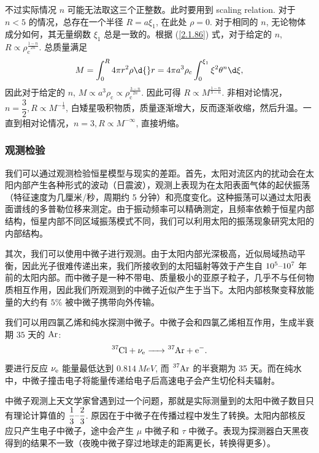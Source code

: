\documentclass[../天体物理基础.tex]{subfiles}
\begin{document}
不过实际情况 $n$ 可能无法取这三个正整数。此时要用到 scaling relation. 对于 $n<5$ 的情况，总存在一个半径 $R=a\xi_{1}$, 在此处 $\rho=0$. 对于相同的 $n$, 无论物体成分如何，其无量纲数 $\xi_{1}$ 总是一致的。根据 (\ref{2.1.86}) 式，对于给定的 $n$, $R\propto\rho_{\mathrm{c}}^{\frac{1-n}{2n}}$. 总质量满足
\begin{equation}
M=\int_{0}^{R}4\pi{}r^{2}\rho\d{}r=4\pi{}a^{3}\rho_{\mathrm{c}}\int_{0}^{\xi_{1}}\xi^{2}\theta^{n}\d\xi,
\end{equation}
因此对于给定的 $n$, $M\propto{}a^{3}\rho_{\mathrm{c}}\propto\rho_{\mathrm{c}}^{\frac{3-n}{2n}}$. 因此可得 $R\propto{}M^{\frac{1-n}{3-n}}$. 非相对论情况，$n=\dfrac{3}{2}, R\propto{}M^{-\frac{1}{3}}$, 白矮星吸积物质，质量逐渐增大，反而逐渐收缩，然后升温。一直到相对论情况，$n=3, R\propto{}M^{-\infty}$, 直接坍缩。

\subsubsection{观测检验}
我们可以通过观测检验恒星模型与现实的差距。首先，太阳对流区内的扰动会在太阳内部产生各种形式的波动（日震波），观测上表现为在太阳表面气体的起伏振荡（特征速度为几厘米/秒，周期约 5 分钟）和亮度变化。这种振荡可以通过太阳表面谱线的多普勒位移来测定。由于振动频率可以精确测定，且频率依赖于恒星内部结构，恒星内部不同区域振荡模式不同，我们可以利用太阳的振荡现象研究太阳的内部结构。

其次，我们可以使用中微子进行观测。由于太阳内部光深极高，近似局域热动平衡，因此光子很难传递出来，我们所接收到的太阳辐射等效于产生自 $10^{5}\text{\textendash}10^{7}$ 年前的太阳内部。而中微子是一种不带电、质量极小的亚原子粒子，几乎不与任何物质相互作用，因此我们所观测到的中微子近似产生于当下。太阳内部核聚变释放能量的大约有 $5\%$ 被中微子携带向外传输。

我们可以用四氯乙烯和纯水探测中微子。中微子会和四氯乙烯相互作用，生成半衰期 $35$ 天的 $\ce{Ar}$:
\begin{equation}
\ce{^{37}Cl}+\nu_{\ce{e}}\ce{->^{37}Ar +e-}.\\
\end{equation}
要进行反应 $\nu_{\ce{e}}$ 能量最低达到 $\qty{0.814}{MeV}$, 而 $\ce{^{37}Ar}$ 的半衰期为 35 天。而在纯水中，中微子撞击电子将能量传递给电子后高速电子会产生切伦科夫辐射。

中微子观测上天文学家曾遇到过一个问题，那就是实际测量到的太阳中微子数目只有理论计算值的 $\dfrac{1}{3}\text{\textendash}\dfrac{2}{3}$. 原因在于中微子在传播过程中发生了转换。太阳内部核反应只产生电子中微子，途中会产生 $\mu$ 中微子和 $\tau$ 中微子。表现为探测器白天黑夜得到的结果不一致（夜晚中微子穿过地球走的距离更长，转换得更多）。
\end{document}
